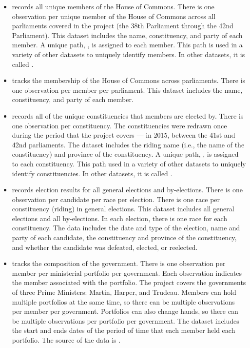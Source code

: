 \begin{itemize}
	
	\item {} records all unique members of the House of Commons. There is one observation per unique member of the House of Commons across all parliaments covered in the project (the 38th Parliament through the 42nd Parliament). This dataset includes the name, constituency, and party of each member. A unique path, , is assigned to each member. This path is used in a variety of other datasets to uniquely identify members. In other datasets, it is called . 
	
	\item {} tracks the membership of the House of Commons across parliaments. There is one observation per member per parliament. This dataset includes the name, constituency, and party of each member.
	
	\item {} records all of the unique constituencies that members are elected by. There is one observation per constituency. The constituencies were redrawn once during the period that the project covers --- in 2015, between the 41st and 42nd parliaments. The dataset includes the riding name (i.e., the name of the constituency) and province of the constituency. A unique path, , is assigned to each constituency. This path used in a variety of other datasets to uniquely identify constituencies.  In other datasets, it is called .
	
	\item {} records election results for all general elections and by-elections. There is one observation per candidate per race per election. There is one race per constituency (riding) in general elections. This dataset includes all general elections and all by-elections. In each election, there is one race for each constituency. The data includes the date and type of the election, name and party of each candidate, the constituency and province of the constituency, and whether the candidate was defeated, elected, or reelected.
	
	\item {} tracks the composition of the government. There is one observation per member per ministerial portfolio per government. Each observation indicates the member associated with the portfolio. The project covers the governments of three Prime Ministers: Martin, Harper, and Trudeau. Members can hold multiple portfolios at the same time, so there can be multiple observations per member per government. Portfolios can also change hands, so there can be multiple observations per portfolio per government. The dataset includes the start and ends dates of the period of time that each member held each portfolio. The source of the data is .
	

\end{itemize}

